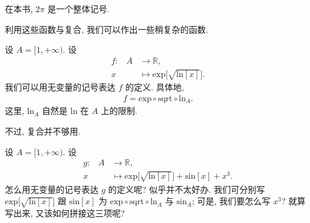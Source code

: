 \begin{remark}
    在本书, $2\pi$ 是一个整体记号.
\end{remark}

利用这些函数与复合, 我们可以作出一些稍复杂的函数.

\begin{example}
    设 $A = [1, +\infty)$. 设
    \begin{align*}
        \text{$f$:} \quad
        A & \to \mathbb{R},                                                \\
        x & \mapsto \mathrm{exp} {\bigg[ \sqrt{\mathrm{ln} {[x]}} \bigg]}.
    \end{align*}
    我们可以用无变量的记号表达 $f$ 的定义.
    具体地,
    \begin{align*}
        f = \mathrm{exp} \circ \mathrm{sqrt} \circ \mathrm{ln}_{A}.
    \end{align*}
    这里, $\mathrm{ln}_{A}$ 自然是
    $\mathrm{ln}$ 在 $A$ 上的限制.
\end{example}

不过, 复合并不够用.

\begin{example}
    设 $A = [1, +\infty)$. 设
    \begin{align*}
        \text{$g$:} \quad
        A & \to \mathbb{R},                                                                           \\
        x & \mapsto \mathrm{exp} {\bigg[ \sqrt{\mathrm{ln} {[x]}} \bigg]} + \mathrm{sin} {[x]} + x^3.
    \end{align*}
    怎么用无变量的记号表达 $g$ 的定义呢?
    似乎并不太好办.
    我们可分别写
    $\mathrm{exp} {\bigg[ \sqrt{\mathrm{ln} {[x]}} \bigg]}$
    跟
    $\mathrm{sin} {[x]}$
    为
    $\mathrm{exp} \circ \mathrm{sqrt} \circ \mathrm{ln}_{A}$
    与
    $\mathrm{sin}_A$;
    可是, 我们要怎么写 $x^3$?
    就算写出来, 又该如何拼接这三项呢?
\end{example}

